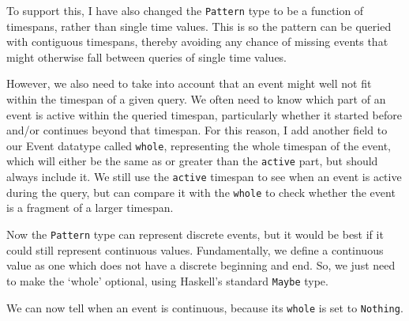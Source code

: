 To support this, I have also changed the \texttt{Pattern} type to be a
function of timespans, rather than single time values. This is so the
pattern can be queried with contiguous timespans, thereby avoiding any
chance of missing events that might otherwise fall between queries of
single time values.

However, we also need to take into account that an event might well not
fit within the timespan of a given query. We often need to know which
part of an event is active within the queried timespan, particularly
whether it started before and/or continues beyond that timespan. For
this reason, I add another field to our Event datatype called
\texttt{whole}, representing the whole timespan of the event, which will
either be the same as or greater than the \texttt{active} part, but
should always include it. We still use the \texttt{active} timespan to
see when an event is active during the query, but can compare it with
the \texttt{whole} to check whether the event is a fragment of a larger
timespan.

\begin{Shaded}
\begin{Highlighting}[]
 \OtherTok{=} \NormalTok{ \{} \NormalTok{,} \NormalTok{,}
\end{Highlighting}
\end{Shaded}

Now the \texttt{Pattern} type can represent discrete events, but it
would be best if it could still represent continuous values.
Fundamentally, we define a continuous value as one which does not have a
discrete beginning and end. So, we just need to make the `whole'
optional, using Haskell's standard \texttt{Maybe} type.

\begin{Shaded}
\begin{Highlighting}[]
 \OtherTok{=} \NormalTok{ \{}  \NormalTok{,} \NormalTok{,}
\end{Highlighting}
\end{Shaded}

We can now tell when an event is continuous, because its \texttt{whole}
is set to \texttt{Nothing}.

